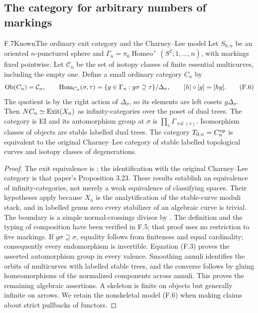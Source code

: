 \subsection{The category for arbitrary numbers of markings}

\begin{statement}{F.7}{Known}{The ordinary exit category and the
Charney--Lee model}
Let $S_{0,n}$ be an oriented $n$-punctured sphere and
$\Gamma_n=\pi_0\operatorname{Homeo}^+(S^2;1,\ldots,n)$, with markings
fixed pointwise.  Let $\mathcal C_n$ be the set of isotopy classes of
finite essential multicurves, including the empty one.  Define a small
ordinary category $C_n$ by
\[
 \operatorname{Ob}(C_n)=\mathcal C_n,\qquad
 \operatorname{Hom}_{C_n}(\sigma,\tau)
 =\{g\in\Gamma_n:g\sigma\supseteq\tau\}/\Delta_\sigma,\qquad
 [h]\circ[g]=[hg].                                      \tag{F.6}
\]
The quotient is by the right action of $\Delta_\sigma$, so its elements
are left cosets $g\Delta_\sigma$.
Then $NC_n\simeq\operatorname{Exit}(X_n)$ as infinity-categories over the poset of
dual trees.  The category is EI and its automorphism group at $\sigma$
is $\prod_v\Gamma_{\operatorname{val}(v)}$.  Isomorphism classes of
objects are stable labelled dual trees.  The category
$T_{0,n}=C_n^{\mathrm{op}}$ is equivalent to the original Charney--Lee category
of stable labelled topological curves and isotopy classes of
degenerations.
\end{statement}
\begin{proof}
The exit equivalence is \citet[Corollary 6.6]{FJansen2023}; the
identification with the original Charney--Lee category is that paper's
Proposition 3.23.  These results establish an equivalence of
infinity-categories, not merely a weak equivalence of classifying
spaces.  Their hypotheses apply because $X_n$ is the analytification of
the stable-curve moduli stack, and in labelled genus zero every
stabilizer of an algebraic curve is trivial.  The boundary is a simple
normal-crossings divisor by \citet[Catalogue, Fact 1]{FKeel1992}.
The definition and the typing of composition have been verified in
F.5; that proof uses no restriction to five markings.  If
$g\sigma\supseteq\sigma$, equality follows from finiteness and equal
cardinality; consequently every endomorphism is invertible.  Equation
(F.3) proves the asserted automorphism group in every valence.
Smoothing annuli identifies the orbits of multicurves with labelled
stable trees, and the converse follows by gluing homeomorphisms of
the normalized components across annuli.  This proves the remaining
algebraic assertions.  A skeleton is finite on objects but generally
infinite on arrows.  We retain the nonskeletal model (F.6) when making
claims about strict pullbacks of functors.
\end{proof}

